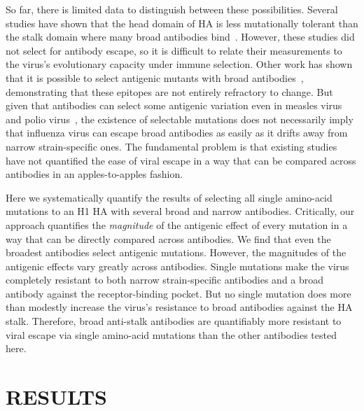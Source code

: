 \documentclass[11pt]{article}
\begin{document}
So far, there is limited data to distinguish between these possibilities.
Several studies have shown that the head domain of HA is less mutationally tolerant than the stalk domain where many broad antibodies bind~\citep{thyagarajan2014inherent,wu2014high,heaton2013genome}.
However, these studies did not select for antibody escape, so it is difficult to relate their measurements to the virus's evolutionary capacity under immune selection.
Other work has shown that it is possible to select antigenic mutants with broad antibodies~\citep{yoshida2009cross,chai2016two}, demonstrating that these epitopes are not entirely refractory to change.
But given that antibodies can select some antigenic variation even in measles virus~\citep{birrer1981antigenic,ter1981antigenic} and polio virus~\citep{crainic1983natural,diamond1985antigenic}, the existence of selectable mutations does not necessarily imply that influenza virus can escape broad antibodies as easily as it drifts away from narrow strain-specific ones.
The fundamental problem is that existing studies have not quantified the ease of viral escape in a way that can be compared across antibodies in an apples-to-apples fashion.

Here we systematically quantify the results of selecting all single amino-acid mutations to an H1 HA with several broad and narrow antibodies.
Critically, our approach quantifies the \emph{magnitude} of the antigenic effect of every mutation in a way that can be directly compared across antibodies.
We find that even the broadest antibodies select antigenic mutations.
However, the magnitudes of the antigenic effects vary greatly across antibodies.
Single mutations make the virus completely resistant to both narrow strain-specific antibodies and a broad antibody against the receptor-binding pocket.
But no single mutation does more than modestly increase the virus's resistance to broad antibodies against the HA stalk.
Therefore, broad anti-stalk antibodies are quantifiably more resistant to viral escape via single amino-acid mutations than the other antibodies tested here. 


\section*{RESULTS}
\label{sec:results}
\end{document}
